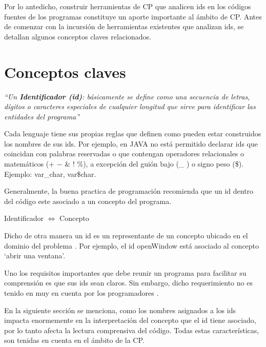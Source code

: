 Por lo antedicho, construir herramientas de CP que analicen ids en los códigos fuentes de los programas constituye un aporte importante al ámbito de CP. Antes de comenzar con la incursión de herramientas existentes que analizan ids, se detallan algunos conceptos claves relacionados.

\section{Conceptos claves}

\textit{“Un \textbf{Identificador (id)}: básicamente se define como una secuencia de letras, dígitos o caracteres especiales de cualquier longitud que sirve para identificar las entidades del programa”}
 
Cada lenguaje tiene sus propias reglas que definen como pueden estar construidos los nombres de sus ids. Por ejemplo, en JAVA no está permitido declarar ids que coincidan con palabras reservadas o que contengan operadores relacionales o matemáticos ($+$ $-$ $\&$ $!$ $\%$), a excepción del guión bajo (\_ ) o signo peso (\$). Ejemplo: \textsf{var\_char, var\$char}.

Generalmente, la buena practica de programación recomienda que un id dentro del código este asociado a un concepto del programa. 

\begin{center}
\textsf{Identificador $\Leftrightarrow$ Concepto}
\end{center}

Dicho de otra manera un id es un representante de un concepto ubicado en el dominio del problema \cite{DFPM05,DMDJ13}. Por ejemplo, el id \textsf{openWindow} está asociado al concepto `abrir una ventana'.

Uno los requisitos importantes que debe reunir un programa para facilitar su comprensión es que sus ids sean claros. Sin embargo, dicho requerimiento no es tenido en muy en cuenta por los programadores \cite{DFPM05,DLHD06,DCHD06,LDFHB07}.

En la siguiente sección se menciona, como los nombres asignados a los ids impacta enormemente en la interpretación del concepto que el id tiene asociado, por lo tanto afecta la lectura comprensiva del código. Todas estas características, son tenidas en cuenta en el ámbito de la CP.

